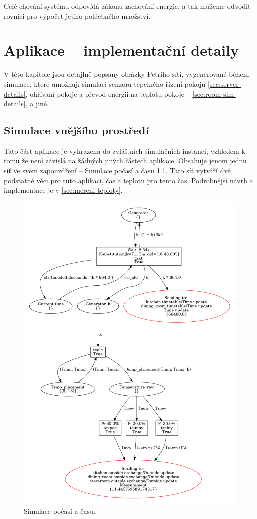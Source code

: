Celé chování systému odpovídá zákonu zachování energie, a tak můžeme odvodit rovnici pro výpočet jejího potřebného množství.

\chapter{Aplikace -- implementační detaily}
\label{chap:app-implementation}

V této kapitole jsou detajlně popsany obrázky Petriho sítí, vygenerované během simulace, které umožnují simulaci senzorů tepelného řízení pokojů \ref{sec:server-details}, ohřívaní pokoje a převod energii na teplotu pokoje -- \ref{sec:room-sim-details}, a jiné.

\section{Simulace vnějšího prostředí}
Tato část aplikace je vyhrazena do zvláštních simulačních instanci, vzhledem k tomu že není závislá na žádných jiných částech aplikace. Obsahuje jenom jednu síť ve svém zapouzdření -- Simulace počasí a času \ref{weather-viz}. Tato síť vytváří dvě podstatné věci pro tuto aplikaci, čas a teplotu pro tento čas. Podrobnější návrh a implementace je v \ref{sec:mereni-teploty}.

\begin{figure}[htb]
 \centering
 \includegraphics[width=\textwidth]{obrazky-figures/weather-sim.png}
 \caption{Simulace počasí a času.}
 \label{weather-viz}
\end{figure}

